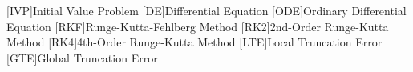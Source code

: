 
\begin{acronym}
	
	[IVP]{Initial Value Problem}
	[DE]{Differential Equation}
	[ODE]{Ordinary Differential Equation}
	[RKF]{Runge-Kutta-Fehlberg Method}
	[RK2]{2nd-Order Runge-Kutta Method}
	[RK4]{4th-Order Runge-Kutta Method}
	[LTE]{Local Truncation Error}
	[GTE]{Global Truncation Error}

\end{acronym}
